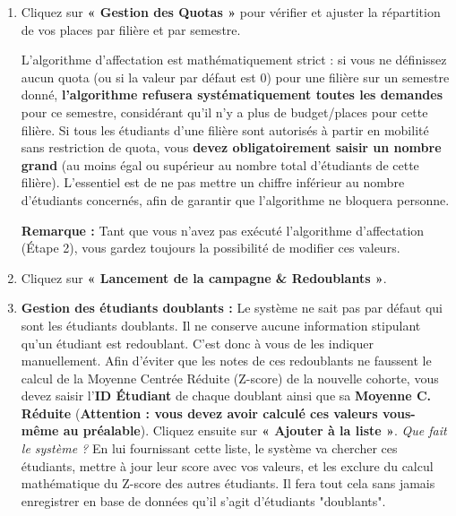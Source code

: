 \documentclass[12pt,a4paper]{article}
\begin{document}
\begin{enumerate}
    \item Cliquez sur \textbf{« Gestion des Quotas »} pour vérifier et ajuster la répartition de vos places par filière et par semestre.
    \begin{tcolorbox}[colback=yellow!10!white,colframe=orange!80!black,title=Règle sur les Quotas de Filière (Cas de mobilité illimitée)]
    L'algorithme d'affectation est mathématiquement strict : si vous ne définissez aucun quota (ou si la valeur par défaut est 0) pour une filière sur un semestre donné, \textbf{l'algorithme refusera systématiquement toutes les demandes} pour ce semestre, considérant qu'il n'y a plus de budget/places pour cette filière.
    \newline Si tous les étudiants d'une filière sont autorisés à partir en mobilité sans restriction de quota, vous \textbf{devez obligatoirement saisir un nombre grand} (au moins égal ou supérieur au nombre total d'étudiants de cette filière). L'essentiel est de ne pas mettre un chiffre inférieur au nombre d'étudiants concernés, afin de garantir que l'algorithme ne bloquera personne.
    \end{tcolorbox}
    \textbf{Remarque :} Tant que vous n'avez pas exécuté l'algorithme d'affectation (Étape 2), vous gardez toujours la possibilité de modifier ces valeurs.
    
    \item Cliquez sur \textbf{« Lancement de la campagne \& Redoublants »}.
    
    \item \textbf{Gestion des étudiants doublants :}
    \newline Le système ne sait pas par défaut qui sont les étudiants doublants. Il ne conserve aucune information stipulant qu'un étudiant est redoublant. C'est donc à vous de les indiquer manuellement.
    \newline Afin d'éviter que les notes de ces redoublants ne faussent le calcul de la Moyenne Centrée Réduite (Z-score) de la nouvelle cohorte, vous devez saisir l'\textbf{ID Étudiant} de chaque doublant ainsi que sa \textbf{Moyenne C. Réduite} (\textbf{Attention : vous devez avoir calculé ces valeurs vous-même au préalable}). Cliquez ensuite sur \textbf{« Ajouter à la liste »}.
    \newline \textit{Que fait le système ?} En lui fournissant cette liste, le système va chercher ces étudiants, mettre à jour leur score avec vos valeurs, et les exclure du calcul mathématique du Z-score des autres étudiants. Il fera tout cela sans jamais enregistrer en base de données qu'il s'agit d'étudiants "doublants".
    

\end{enumerate}
\end{document}
